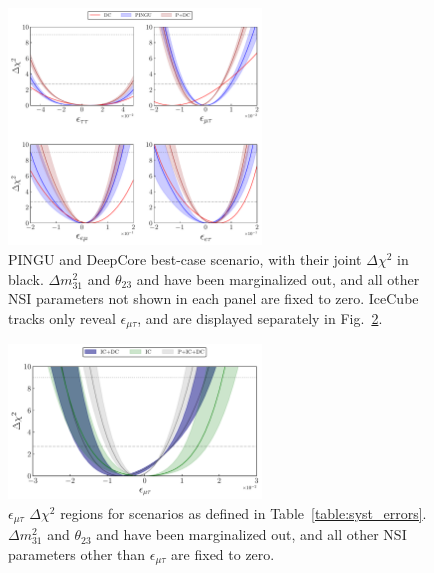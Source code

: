 \documentclass[draft=True]{revtex4-2}
\newcommand{\emt}{\ensuremath{\epsilon_{\mu\tau}}}
\newcommand{\dm}{\Delta m^2_{31}}
\begin{document}
{\begin{figure}
   \begin{center}
      \includegraphics[width=0.6\textwidth]{figures/joint_3D_NO.pdf}
      \caption{PINGU and DeepCore best-case scenario, with their joint $\Delta \chi^2$ in black. $\dm$ and $\theta_{23}$ and have been marginalized out, and all other NSI 
      parameters not shown in each panel are fixed to zero. 
      IceCube tracks only reveal $\emt$, and are displayed separately in Fig.~\ref{fig:IC_3D}.}\label{fig:3D_NO}
   \end{center}
\end{figure} 
\begin{figure}
   \begin{center} 
      \includegraphics[width=0.6\textwidth]{figures/PID_3D_emt.pdf}
      \caption{$\emt$ $\Delta \chi^2$ regions for scenarios as defined in Table~\ref{table:syst_errors}.
    $\dm$ and $\theta_{23}$ and have been marginalized out, and all other NSI 
    parameters other than $\emt$ are fixed to zero.}\label{fig:IC_3D}
   \end{center}
\end{figure}



}
\end{document}

